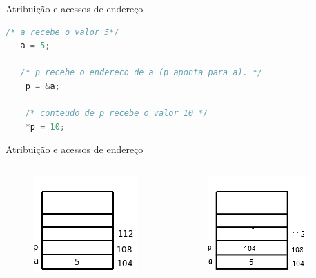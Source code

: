 \begin{frame}[fragile,c]{Atribuição e acessos de endereço}
 \begin{lstlisting}[language=C]
   /* a recebe o valor 5*/
   a = 5;
   
   /* p recebe o endereco de a (p aponta para a). */
    p = &a;
    
    /* conteudo de p recebe o valor 10 */
    *p = 10;
 \end{lstlisting}
\end{frame}

\begin{frame}[plain,c]{Atribuição e acessos de endereço}  
    \begin{columns}
    \column{5cm}
      \begin{figure}[ht]
        \centering
        \includegraphics[width=.6\textwidth]{figs/fig_ponteiros/memoria-atribuicao-a}
      \end{figure}
    \column{5cm}
        \begin{figure}[ht]
          \centering
          \includegraphics[width=.6\textwidth]{figs/fig_ponteiros/memoria-atribuicao-p}
        \end{figure} 

\end{columns}
\end{frame}
